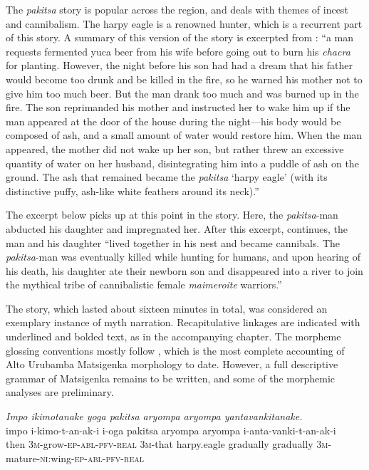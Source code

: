 \documentclass[output=paper]{LSP/langsci}
\begin{document}
The \textit{pakitsa} story is popular across the region, and deals with themes of incest and cannibalism. The harpy eagle is a renowned hunter, which is a recurrent part of this story. A summary of this version of the story is excerpted from \citet[][255--256]{emlen14}: ``a man requests fermented yuca beer from his wife before going out to burn his \textit{chacra} for planting. However, the night before his son had had a dream that his father would become too drunk and be killed in the fire, so he warned his mother not to give him too much beer. But the man drank too much and was burned up in the fire. The son reprimanded his mother and instructed her to wake him up if the man appeared at the door of the house during the night—his body would be composed of ash, and a small amount of water would restore him. When the man appeared, the mother did not wake up her son, but rather threw an excessive quantity of water on her husband, disintegrating him into a puddle of ash on the ground. The ash that remained became the \textit{pakitsa} `harpy eagle' (with its distinctive puffy, ash-like white feathers around its neck).'' 

The excerpt below picks up at this point in the story. Here, the \textit{pakitsa}-man abducted his daughter and impregnated her. After this excerpt, \citet[][256]{emlen14} continues, the man and his daughter ``lived together in his nest and became cannibals. The \textit{pakitsa}-man was eventually killed while hunting for humans, and upon hearing of his death, his daughter ate their newborn son and disappeared into a river to join the mythical tribe of cannibalistic female \textit{maimeroite} warriors.'' 

The story, which lasted about sixteen minutes in total, was considered an exemplary instance of myth narration. Recapitulative linkages are indicated with underlined and bolded text, as in the accompanying chapter. The morpheme glossing conventions mostly follow \citet{vargas13}, which is the most complete accounting of Alto Urubamba Matsigenka morphology to date. However, a full descriptive grammar of Matsigenka remains to be written, and some of the morphemic analyses are preliminary.


\begin{exe}
\ex \label{Emapp01}
\glt \textit{Impo ikimotanake yoga pakitsa aryompa aryompa yantavankitanake.}\\
\gll impo i-kimo-t-an-ak-i i-oga pakitsa aryompa aryompa i-anta-vanki-t-an-ak-i\\
then \textsc{3m-}grow\textsc{-ep-abl-pfv-real} \textsc{3m-}that harpy.eagle gradually gradually \textsc{3m-}mature-\textsc{ni:}wing\textsc{-ep-abl-pfv-real}\\
\glt {}\\
\end{exe}
\end{document}

